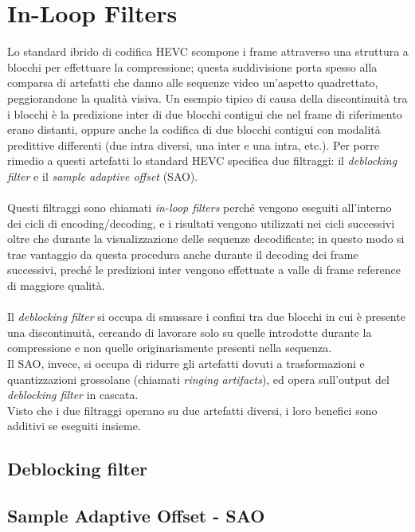 \section{In-Loop Filters}
Lo standard ibrido di codifica HEVC scompone i frame attraverso una struttura a 
blocchi per effettuare la compressione; questa suddivisione porta spesso alla 
comparsa di artefatti che danno alle sequenze video un'aspetto quadrettato, 
peggiorandone la qualità visiva. Un esempio tipico di causa della discontinuità 
tra i blocchi è la predizione inter di due blocchi contigui che nel frame
 di riferimento erano distanti, oppure anche la codifica di due blocchi contigui
 con modalità predittive differenti (due intra diversi, una inter e una intra, 
etc.). Per porre rimedio a questi artefatti lo standard HEVC specifica due 
filtraggi: il \emph{deblocking filter} e il \emph{sample adaptive offset} (SAO).
\\ \\
Questi filtraggi sono chiamati \emph{in-loop filters} perché vengono eseguiti 
all'interno dei cicli di encoding/decoding, e i risultati vengono utilizzati 
nei cicli successivi oltre che durante la visualizzazione delle sequenze 
decodificate; in questo modo si trae vantaggio da questa procedura anche durante
 il decoding dei frame successivi, preché le predizioni inter vengono effettuate
 a valle di frame reference di maggiore qualità.
\\ \\
Il \emph{deblocking filter} si occupa di smussare i confini tra due blocchi in 
cui è presente una discontinuità, cercando di lavorare solo su quelle 
introdotte durante la compressione e non quelle originariamente presenti nella 
sequenza. \\
Il SAO, invece, si occupa di ridurre gli artefatti dovuti a trasformazioni e 
quantizzazioni grossolane (chiamati \emph{ringing artifacts}), ed opera 
sull'output del \emph{deblocking filter} in cascata. \\
Visto che i due filtraggi operano su due artefatti diversi, i loro benefici 
sono additivi se eseguiti insieme.
\subsection{Deblocking filter}

\subsection{Sample Adaptive Offset - SAO}
